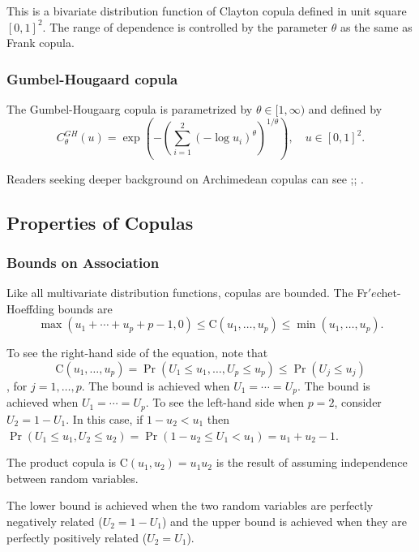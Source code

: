 \documentclass[]{book}
\theoremstyle{definition}
\theoremstyle{definition}
\theoremstyle{definition}
\theoremstyle{remark}
\begin{document}
This is a bivariate distribution function of Clayton copula defined in
unit square \([0,1]^2.\) The range of dependence is controlled by the
parameter \(\theta\) as the same as Frank copula.

\subsubsection{Gumbel-Hougaard copula}\label{gumbel-hougaard-copula}

The Gumbel-Hougaarg copula is parametrized by \(\theta \in [1,\infty)\)
and defined by
\[C_{\theta}^{GH}(u)=\exp\left(-\left(\sum_{i=1}^2 (-\log u_i)^{\theta}\right)^{1/\theta}\right), \quad u\in[0,1]^2.\]

Readers seeking deeper background on Archimedean copulas can see
\citep{joe2014dependence};\citep{frees1998understanding};
\citep{genest1986bivariate}.

\subsection{Properties of Copulas}\label{properties-of-copulas}

\subsubsection{Bounds on Association}\label{bounds-on-association}

Like all multivariate distribution functions, copulas are bounded. The
Fr\('{e}\)chet-Hoeffding bounds are
\[\max( u_1 +\cdots+ u_p + p -1, 0) \leq  \mathrm{C}(u_1,  \ldots, u_p) \leq \min (u_1,  \ldots,u_p).\]

To see the right-hand side of the equation, note that
\[\mathrm{C}(u_1,\ldots, u_p) = \Pr(U_1 \leq u_1, \ldots, U_p \leq u_p) \leq  \Pr(U_j \leq u_j)\],
for \(j=1,\ldots,p\). The bound is achieved when \(U_1 = \cdots = U_p\).
The bound is achieved when \(U_1 = \cdots = U_p\). To see the left-hand
side when \(p=2\), consider \(U_2=1-U_1\). In this case, if
\(1-u_2 < u_1\) then
\(\Pr(U_1 \leq u_1, U_2 \leq u_2) = \Pr ( 1-u_2 \leq U_1 < u_1) =u_1+u_2-1.\)
\citep{nelsen1997introduction}

The product copula is \(\mathrm{C}(u_1,u_2)=u_1u_2\) is the result of
assuming independence between random variables.

The lower bound is achieved when the two random variables are perfectly
negatively related (\(U_2=1-U_1\)) and the upper bound is achieved when
they are perfectly positively related (\(U_2=U_1\)).
\end{document}
